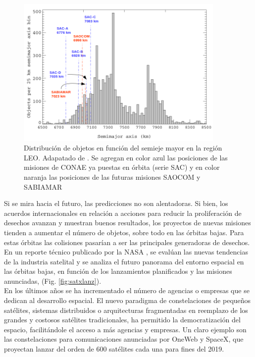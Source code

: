 \begin{figure}[!h]
  \centering
  \includegraphics[width=0.9\textwidth]{imagenes/SDvsaltura2011CONAE}
  \caption[Distribuci\'on de objetos en funci\'on del semieje mayor.]{Distribuci\'on de objetos en funci\'on del semieje mayor en la regi\'on LEO. Adapatado de \citep{Klinkrad}. Se agregan en color azul las posiciones de las misiones de CONAE ya puestas en \'orbita (serie SAC) y en color naranja las posiciones de las futuras misiones SAOCOM y SABIAMAR}
  \label{fig:Dvsaltura}
\end{figure}

Si se mira hacia el futuro, las predicciones no son alentadoras. Si bien, los acuerdos internacionales en relaci\'on a acciones para reducir la proliferaci\'on de desechos avanzan y muestran buenos resultados, los proyectos de nuevas misiones tienden a aumentar el n\'umero de objetos, sobre todo en las \'orbitas bajas. Para estas \'orbitas las colisiones pasar\'ian a ser las principales generadoras de desechos.\\

En un reporte t\'ecnico publicado por la NASA \citep{karacalioglu2016impact}, se eval\'uan las nuevas tendencias de la industria satelital y se analiza el futuro panorama del entorno espacial en las \'orbitas bajas, en funci\'on de los lanzamientos planificados y las misiones anunciadas, (Fig. \ref{fig:satxlanz}).\\

En los \'ultimos a\~nos se ha incrementado el n\'umero de agencias o empresas que se dedican al desarrollo espacial. El nuevo paradigma de constelaciones de peque\~nos sat\'elites, sistemas distribuidos o arquitecturas fragmentadas en reemplazo de los grandes y costosos sat\'elites tradicionales, ha permitido la democratizaci\'on del espacio, facilit\'andole el acceso a m\'as agencias y empresas. 
Un claro ejemplo son las constelaciones para comunicaciones anunciadas por OneWeb y SpaceX, que proyectan lanzar del orden de 600 sat\'elites cada una para fines del 2019.

